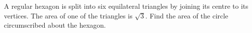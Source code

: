 A regular hexagon is split into six equilateral triangles by joining its centre to its vertices. The area of one of the triangles is $\sqrt3$. Find the area of the circle circumscribed about the hexagon.
